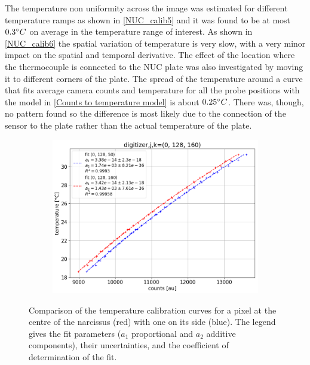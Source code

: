 The temperature non uniformity across the image was estimated for different temperature ramps as shown in \autoref{NUC_calib5} and it was found to be at most $0.3\degree C$ on average in the temperature range of interest. As shown in \autoref{NUC_calib6} the spatial variation of temperature is very slow, with a very minor impact on the spatial and temporal derivative. The effect of the location where the thermocouple is connected to the NUC plate was also investigated by moving it to different corners of the plate. The spread of the temperature around a curve that fits average camera counts and temperature for all the probe positions with the model in \autoref{Counts to temperature model} is about $0.25\degree C$. There was, though, no pattern found so the difference is most likely due to the connection of the sensor to the plate rather than the actual temperature of the plate.

\begin{figure}[!ht]
     \centering
     \begin{subfigure}{0.7\linewidth}
         \centering
         \includegraphics[trim={5 0 0 25},clip,width=\linewidth]{Chapters/chapter2/figs/example_BB_fit(0, 128, 160)2.png}
     \end{subfigure}
    \caption{Comparison of the temperature calibration curves for a pixel at the centre of the narcissus (red) with one on its side (blue). The legend gives the fit parameters ($a_1$ proportional and $a_2$ additive components), their uncertainties, and the coefficient of determination of the fit.}
    \label{fig:example_BB_fit}
\end{figure}

